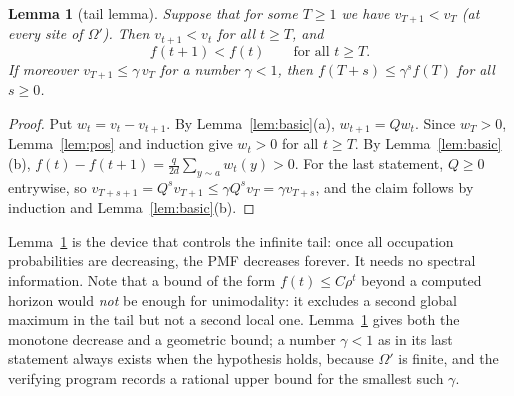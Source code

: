 \documentclass[11pt,a4paper]{article}
\newtheorem{lemma}[theorem]{Lemma}
\theoremstyle{definition}
\theoremstyle{remark}
\begin{document}
\begin{lemma}[tail lemma]\label{lem:tail}
Suppose that for some $T\ge1$ we have $v_{T+1}<v_T$ (at every site of $\Omega'$). Then $v_{t+1}<v_t$ for all $t\ge T$, and
\[
f(t+1)<f(t)\qquad\text{for all } t\ge T .
\]
If moreover $v_{T+1}\le\gamma\,v_T$ for a number $\gamma<1$, then $f(T+s)\le\gamma^sf(T)$ for all $s\ge0$.
\end{lemma}
\begin{proof}
Put $w_t=v_t-v_{t+1}$. By Lemma~\ref{lem:basic}(a), $w_{t+1}=Qw_t$. Since $w_T>0$, Lemma~\ref{lem:pos} and induction give $w_t>0$ for all $t\ge T$. By Lemma~\ref{lem:basic}(b), $f(t)-f(t+1)=\frac{q}{2d}\sum_{y\sim a}w_t(y)>0$. For the last statement, $Q\ge0$ entrywise, so $v_{T+s+1}=Q^sv_{T+1}\le\gamma Q^sv_T=\gamma v_{T+s}$, and the claim follows by induction and Lemma~\ref{lem:basic}(b).
\end{proof}

Lemma~\ref{lem:tail} is the device that controls the infinite tail: once all occupation probabilities are decreasing, the PMF decreases forever. It needs no spectral information. Note that a bound of the form $f(t)\le C\rho^t$ beyond a computed horizon would \emph{not} be enough for unimodality: it excludes a second global maximum in the tail but not a second local one. Lemma~\ref{lem:tail} gives both the monotone decrease and a geometric bound; a number $\gamma<1$ as in its last statement always exists when the hypothesis holds, because $\Omega'$ is finite, and the verifying program records a rational upper bound for the smallest such $\gamma$.
\end{document}
